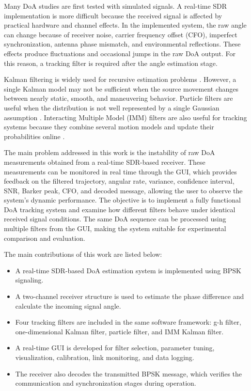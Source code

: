 \documentclass[conference]{IEEEtran}
\begin{document}
Many DoA studies are first tested with simulated signals. A real-time SDR implementation is more difficult because the received signal is affected by practical hardware and channel effects. In the implemented system, the raw angle can change because of receiver noise, carrier frequency offset (CFO), imperfect synchronization, antenna phase mismatch, and environmental reflections. These effects produce fluctuations and occasional jumps in the raw DoA output. For this reason, a tracking filter is required after the angle estimation stage.

Kalman filtering is widely used for recursive estimation problems \cite{Hou2023RobustVB-EKF, Zhou2024RealTime}. However, a single Kalman model may not be sufficient when the source movement changes between nearly static, smooth, and maneuvering behavior. Particle filters are useful when the distribution is not well represented by a single Gaussian assumption \cite{Zocca2022PFWeight}. Interacting Multiple Model (IMM) filters are also useful for tracking systems because they combine several motion models and update their probabilities online \cite{Lim2020IMMPF}.

The main problem addressed in this work is the instability of raw DoA measurements obtained from a real-time SDR-based receiver. These measurements can be monitored in real time through the GUI, which provides feedback on the filtered trajectory, angular rate, variance, confidence interval, SNR, Barker peak, CFO, and decoded message, allowing the user to observe the system's dynamic performance. The objective is to implement a fully functional DoA tracking system and examine how different filters behave under identical received signal conditions. The same DoA sequence can be processed using multiple filters from the GUI, making the system suitable for experimental comparison and evaluation.

The main contributions of this work are listed below:
\begin{itemize}
    \item A real-time SDR-based DoA estimation system is implemented using BPSK signaling.
    \item A two-channel receiver structure is used to estimate the phase difference and calculate the incoming signal angle.
    \item Four tracking filters are included in the same software framework: g-h filter, one-dimensional Kalman filter, particle filter, and IMM Kalman filter.
    \item A real-time GUI is developed for filter selection, parameter tuning, visualization, calibration, link monitoring, and data logging.
    \item The receiver also decodes the transmitted BPSK message, which verifies the communication and synchronization stages during operation.
\end{itemize}
\end{document}
